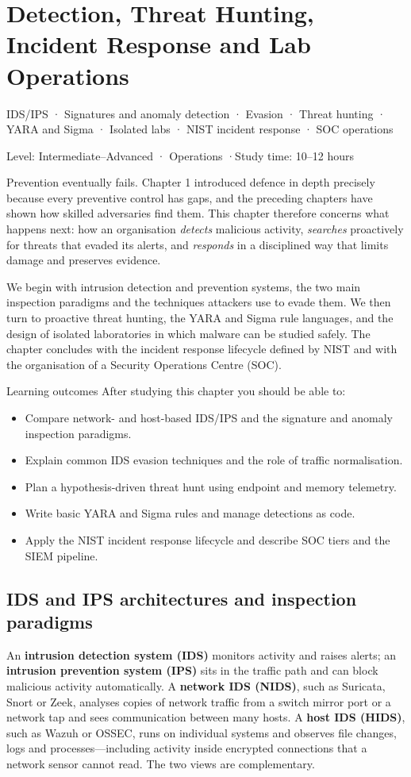 \documentclass[11pt,openany]{book}
\newcommand{\chaptermeta}[3]{%
  {\sffamily\small\color{accent}#1\par}\vspace{0.3em}
  {\sffamily\footnotesize\color{gray}#2 \quad·\quad #3\par}\vspace{1.2em}}
\begin{document}
\chapter{Detection, Threat Hunting, Incident Response and Lab Operations}\label{ch:11}
\chaptermeta{IDS/IPS · Signatures and anomaly detection · Evasion · Threat hunting · YARA and Sigma · Isolated labs · NIST incident response · SOC operations}{Level: Intermediate–Advanced · Operations}{Study time: 10–12 hours}

Prevention eventually fails. Chapter 1 introduced defence in depth precisely because every preventive control has gaps, and the preceding chapters have shown how skilled adversaries find them. This chapter therefore concerns what happens next: how an organisation \emph{detects} malicious activity, \emph{searches} proactively for threats that evaded its alerts, and \emph{responds} in a disciplined way that limits damage and preserves evidence.

We begin with intrusion detection and prevention systems, the two main inspection paradigms and the techniques attackers use to evade them. We then turn to proactive threat hunting, the YARA and Sigma rule languages, and the design of isolated laboratories in which malware can be studied safely. The chapter concludes with the incident response lifecycle defined by NIST and with the organisation of a Security Operations Centre (SOC).

\begin{outcomesbox}{Learning outcomes}
After studying this chapter you should be able to:
\begin{itemize}
  \item Compare network- and host-based IDS/IPS and the signature and anomaly inspection paradigms.
  \item Explain common IDS evasion techniques and the role of traffic normalisation.
  \item Plan a hypothesis-driven threat hunt using endpoint and memory telemetry.
  \item Write basic YARA and Sigma rules and manage detections as code.
  \item Apply the NIST incident response lifecycle and describe SOC tiers and the SIEM pipeline.
\end{itemize}
\end{outcomesbox}

\section{IDS and IPS architectures and inspection paradigms}\label{sec:11.1}
An \textbf{intrusion detection system (IDS)} monitors activity and raises alerts; an \textbf{intrusion prevention system (IPS)} sits in the traffic path and can block malicious activity automatically. A \textbf{network IDS (NIDS)}, such as Suricata, Snort or Zeek, analyses copies of network traffic from a switch mirror port or a network tap and sees communication between many hosts. A \textbf{host IDS (HIDS)}, such as Wazuh or OSSEC, runs on individual systems and observes file changes, logs and processes—including activity inside encrypted connections that a network sensor cannot read. The two views are complementary.
\end{document}
